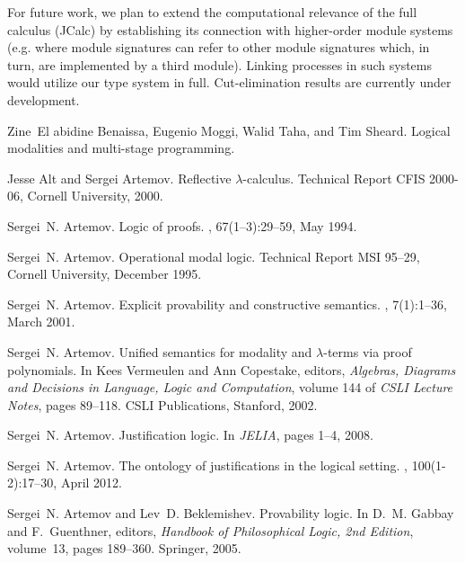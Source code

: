 \documentclass[11pt]{entcs}
\begin{document}
{For future work, we plan to extend the computational relevance of the full calculus ({\sf JCalc}) by establishing its connection with higher-order module systems (e.g. where module signatures can refer to other module signatures which, in turn, are implemented by a third module). Linking processes in such systems would utilize our type system in full. Cut-elimination results are currently under development.

%
\begin{thebibliography}{10}

Zine~El abidine Benaissa, Eugenio Moggi, Walid Taha, and Tim Sheard.
\newblock Logical modalities and multi-stage programming.

Jesse Alt and Sergei Artemov.
\newblock Reflective $\lambda$-calculus.
\newblock Technical Report CFIS 2000-06, Cornell University, 2000.

Sergei~N. Artemov.
\newblock Logic of proofs.
, 67(1--3):29--59, May 1994.

Sergei~N. Artemov.
\newblock Operational modal logic.
\newblock Technical Report MSI 95--29, Cornell University, December 1995.

Sergei~N. Artemov.
\newblock Explicit provability and constructive semantics.
, 7(1):1--36, March 2001.

Sergei~N. Artemov.
\newblock Unified semantics for modality and {$\lambda$}-terms via proof
  polynomials.
\newblock In Kees Vermeulen and Ann Copestake, editors, {\em Algebras, Diagrams
  and Decisions in Language, Logic and Computation}, volume 144 of {\em CSLI
  Lecture Notes}, pages 89--118. {CSLI} {P}ublications, Stanford, 2002.

Sergei~N. Artemov.
\newblock Justification logic.
\newblock In {\em JELIA}, pages 1--4, 2008.

Sergei~N. Artemov.
\newblock The ontology of justifications in the logical setting.
, 100(1-2):17--30, April 2012.

Sergei~N. Artemov and Lev~D. Beklemishev.
\newblock Provability logic.
\newblock In D.~M. Gabbay and F.~Guenthner, editors, {\em Handbook of
  Philosophical Logic, 2nd Edition}, volume~13, pages 189--360. Springer, 2005.


\end{thebibliography}}
\end{document}
